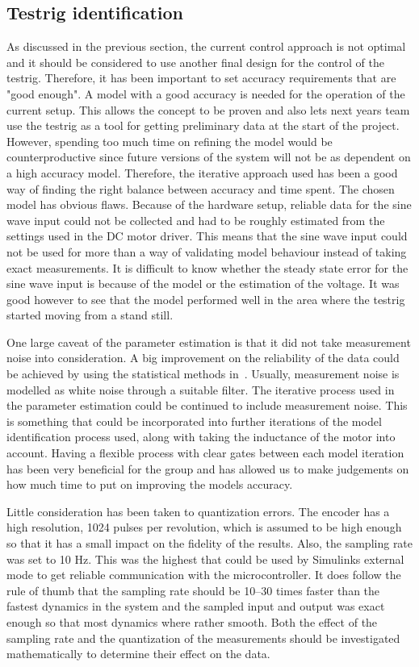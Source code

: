 \subsection{Testrig identification}
As discussed in the previous section, the current control approach is not
optimal and it should be considered to use another final design for the control of the testrig. Therefore, it has been
important to set accuracy requirements that are "good enough". A model with a
good accuracy is needed for the operation of the current setup. This allows the
concept to be proven and also lets next years team use the testrig as a tool for
getting preliminary data at the start of the project. However, spending too much
time on refining the model would be counterproductive since future versions of
the system will not be as dependent on a high accuracy model. Therefore, the
iterative approach used has been a good way of finding the right balance between
accuracy and time spent. The chosen model has obvious flaws.  Because of the
hardware setup, reliable data for the sine wave input could not be collected and
had to be roughly estimated from the settings used in the DC motor driver. This
means that the sine wave input could not be used for more than a way of
validating model behaviour instead of taking exact measurements.  It is
difficult to know whether the steady state error for the sine wave input is
because of the model or the estimation of the voltage.  It was good however to
see that the model performed well in the area where the testrig started moving
from a stand still. 

One large caveat of the parameter estimation is that it did not take measurement
noise into consideration. A big improvement on the reliability of the data could
be achieved by using the statistical methods in~\cite{modeling1994}. Usually,
measurement noise is modelled as white noise through a suitable filter. The
iterative process used in the parameter estimation could be continued to include
measurement noise. This is something that could be incorporated into further
iterations of the model identification process used, along with taking the
inductance of the motor into account. Having a flexible process with clear gates
between each model iteration has been very beneficial for the group and has
allowed us to make judgements on how much time to put on improving the models
accuracy.

Little consideration has been taken to quantization errors. The
encoder has a high resolution, 1024 pulses per revolution, which is assumed to
be high enough so that it has a small impact on the fidelity of the results.
Also, the sampling rate was set to 10 Hz. This was the highest that could be
used by Simulinks external mode to get reliable communication with the
microcontroller. It does follow the rule of thumb that the sampling rate should
be 10--30 times faster than the fastest dynamics in the system and the sampled
input and output was exact enough so that most dynamics where rather smooth.
Both the effect of the sampling rate and the quantization of the measurements
should be investigated mathematically to determine their effect on the data.

